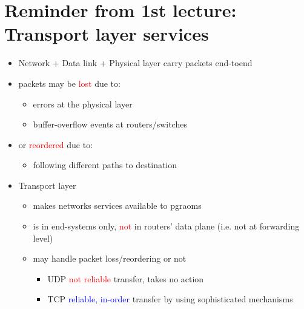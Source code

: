 \documentclass[11pt]{article}
\begin{document}
\section*{Reminder from 1st lecture: Transport layer services}
\begin{minipage}{0.5\textwidth}
\begin{itemize}
	\item Network + Data link + Physical layer carry packets end-toend
	\item packets may be \textcolor{red}{lost} due to:
		\begin{itemize}
			\item errors at the physical layer
			\item buffer-overflow events at routers/switches
		\end{itemize}
	\item or \textcolor{red}{reordered} due to:
		\begin{itemize}
			\item following different paths to destination
		\end{itemize}
\end{itemize}

\end{minipage}
\begin{minipage}{0.5\textwidth}
\begin{itemize}
	\item Transport layer
		\begin{itemize}
			\item makes networks services available to pgraoms
			\item is in end-systems only, \textcolor{red}{not} in routers' data plane (i.e. not at forwarding level)
			\item may handle packet loss/reordering or not
				\begin{itemize}
					\item UDP \textcolor{red}{not reliable} transfer, takes no action
					\item TCP \textcolor{blue}{reliable, in-order} transfer by using sophisticated mechanisms
				\end{itemize}
		\end{itemize}
\end{itemize}
\end{minipage}
\end{document}
